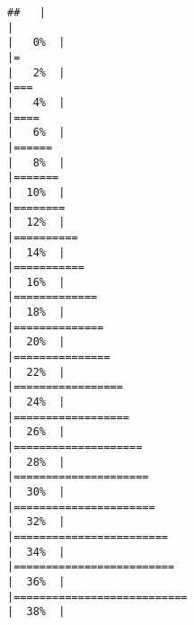 \documentclass[
]{article}
\begin{document}
\begin{verbatim}
##   |                                                                              |                                                                      |   0%  |                                                                              |=                                                                     |   2%  |                                                                              |===                                                                   |   4%  |                                                                              |====                                                                  |   6%  |                                                                              |======                                                                |   8%  |                                                                              |=======                                                               |  10%  |                                                                              |========                                                              |  12%  |                                                                              |==========                                                            |  14%  |                                                                              |===========                                                           |  16%  |                                                                              |=============                                                         |  18%  |                                                                              |==============                                                        |  20%  |                                                                              |===============                                                       |  22%  |                                                                              |=================                                                     |  24%  |                                                                              |==================                                                    |  26%  |                                                                              |====================                                                  |  28%  |                                                                              |=====================                                                 |  30%  |                                                                              |======================                                                |  32%  |                                                                              |========================                                              |  34%  |                                                                              |=========================                                             |  36%  |                                                                              |===========================                                           |  38%  |                                                                              
\end{verbatim}
\end{document}
